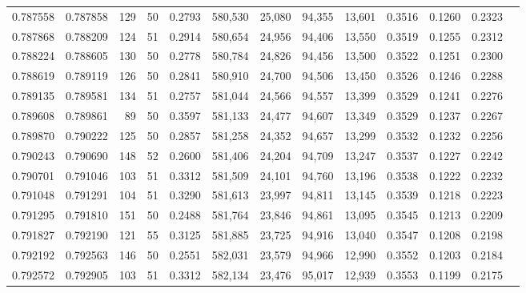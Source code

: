 \begin{tabular}{rrrrrrrrrrrrr}
0.787558 & 0.787858 &   129 &  50 &                                     0.2793 & 580,530 &  25,080 &  94,355 &  13,601 & 0.3516 & 0.1260 & 0.2323 \\
0.787868 & 0.788209 &   124 &  51 &                                     0.2914 & 580,654 &  24,956 &  94,406 &  13,550 & 0.3519 & 0.1255 & 0.2312 \\
0.788224 & 0.788605 &   130 &  50 &                                     0.2778 & 580,784 &  24,826 &  94,456 &  13,500 & 0.3522 & 0.1251 & 0.2300 \\
0.788619 & 0.789119 &   126 &  50 &                                     0.2841 & 580,910 &  24,700 &  94,506 &  13,450 & 0.3526 & 0.1246 & 0.2288 \\
0.789135 & 0.789581 &   134 &  51 &                                     0.2757 & 581,044 &  24,566 &  94,557 &  13,399 & 0.3529 & 0.1241 & 0.2276 \\
0.789608 & 0.789861 &    89 &  50 &                                     0.3597 & 581,133 &  24,477 &  94,607 &  13,349 & 0.3529 & 0.1237 & 0.2267 \\
0.789870 & 0.790222 &   125 &  50 &                                     0.2857 & 581,258 &  24,352 &  94,657 &  13,299 & 0.3532 & 0.1232 & 0.2256 \\
0.790243 & 0.790690 &   148 &  52 &                                     0.2600 & 581,406 &  24,204 &  94,709 &  13,247 & 0.3537 & 0.1227 & 0.2242 \\
0.790701 & 0.791046 &   103 &  51 &                                     0.3312 & 581,509 &  24,101 &  94,760 &  13,196 & 0.3538 & 0.1222 & 0.2232 \\
0.791048 & 0.791291 &   104 &  51 &                                     0.3290 & 581,613 &  23,997 &  94,811 &  13,145 & 0.3539 & 0.1218 & 0.2223 \\
0.791295 & 0.791810 &   151 &  50 &                                     0.2488 & 581,764 &  23,846 &  94,861 &  13,095 & 0.3545 & 0.1213 & 0.2209 \\
0.791827 & 0.792190 &   121 &  55 &                                     0.3125 & 581,885 &  23,725 &  94,916 &  13,040 & 0.3547 & 0.1208 & 0.2198 \\
0.792192 & 0.792563 &   146 &  50 &                                     0.2551 & 582,031 &  23,579 &  94,966 &  12,990 & 0.3552 & 0.1203 & 0.2184 \\
0.792572 & 0.792905 &   103 &  51 &                                     0.3312 & 582,134 &  23,476 &  95,017 &  12,939 & 0.3553 & 0.1199 & 0.2175 \\

\end{tabular}
